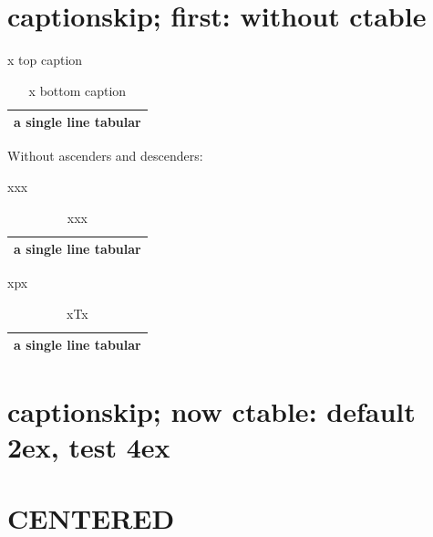 \documentclass[12pt,twoside]{memoir}
\begin{document}
\chapter{captionskip; first: without ctable}
\begin{table}[h!]\begin{center}
  \caption{x top caption}
  \begin{tabular}{c}\hline a single line tabular\tabularnewline\hline\end{tabular}
  \setcounter{table}{0}
  \caption{x bottom caption}
\end{center}\end{table}

Without ascenders and descenders:
\begin{table}[h!]\begin{center}
  \setcounter{table}{0}
  \caption{xxx}
  \begin{tabular}{c}\hline a single line tabular\tabularnewline\hline\end{tabular}
  \setcounter{table}{0}
  \caption{xxx}
\end{center}\end{table}

\begin{table}[h!]\begin{center}
  \setcounter{table}{0}
  \caption{xpx}
  \begin{tabular}{c}\hline a single line tabular\tabularnewline\hline\end{tabular}
  \setcounter{table}{0}
  \caption{xTx}
\end{center}\end{table}

\chapter{captionskip; now ctable: default 2ex, test 4ex}
\setcounter{table}{0}
\setcounter{table}{0}
\setcounter{table}{0}
\setcounter{table}{0}

\chapter{CENTERED}
\end{document}

